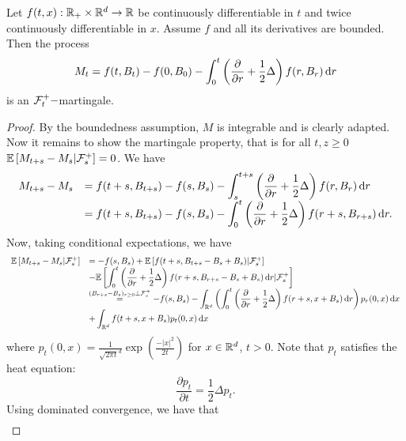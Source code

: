 \documentclass{article}
\begin{document}
\begin{theorem}\label{thm: bm ito formula}
Let $ f(t, x):\mathbb{R}_{+}\times \mathbb{R}^{d}\to \mathbb{R}$ be continuously differentiable in $ t$ and twice continuously differentiable in $ x$. Assume $ f$ and all its derivatives are bounded. Then the process 
\[
M_{t} = f(t, B_{t})-f(0, B_{0})- \displaystyle\int^{t}_{0} \left( \frac{\partial}{\partial r}+\frac{1}{2}\Delta \right) f(r, B_{r})\operatorname{d}\! r   
\]
is an $\mathcal{F}^{+}_{t}-$martingale. 
\end{theorem}

\begin{proof}
    By the boundedness assumption, $ M$ is integrable and is clearly adapted. Now it remains to show the martingale property, that is for all $ t, z\geq 0$ $ \mathbb{E}\left[ M_{t+s}-M_{s} |\mathcal{F}^{+}_{s}\right] = 0$. We have 
    \[
    \begin{array}{ll}
        M_{t+s}-M_{s} &= f(t+s, B_{t+s})-f(s, B_{s}) - \displaystyle\int^{t+s}_{s} \left( \frac{\partial}{\partial r}+\frac{1}{2}\Delta \right) f(r, B_{r})\operatorname{d}\! r    \\
         &= f(t+s, B_{t+s})-f(s, B_{s}) - \displaystyle\int^{t}_{0} \left( \frac{\partial}{\partial r}+\frac{1}{2}\Delta \right) f(r+s, B_{r+s})\operatorname{d}\! r.
    \end{array}
    \]
    Now, taking conditional expectations, we have 
    \[
    \begin{array}{ll}
        \mathbb{E}\left[ M_{t+s}-M_{s}  |\mathcal{F}^{+}_{s}\right] &= -f(s, B_{s}) + \mathbb{E}\left[ f(t+s, B_{t+s}-B_{s}+B_{s}) |\mathcal{F}^{+}_{s} \right] \\
         &- \mathbb{E}\left[ \displaystyle\int^{t}_{0} \left( \frac{\partial}{\partial r}+\frac{1}{2}\Delta \right) f(r+s, B_{r+s}-B_{s}+B_{s})\operatorname{d}\! r |\mathcal{F}^{+}_{s}\right]\\ 
	 &\stackrel{(B_{r+s}-B_{s})_{r\geq 0}\perp \mathcal{F}^{+}_{s}}{=} -f(s, B_{s}) - \displaystyle\int_{\mathbb{R}^{d}}\left( \displaystyle\int^{t}_{0} \left( \frac{\partial}{\partial r}+\frac{1}{2}\Delta \right) f(r+s, x+B_{s})\operatorname{d}\! r \right) p_{r}(0,x)\operatorname{d}\! x\\ 
	 &+ \displaystyle\int_{\mathbb{R}^{d}}f(t+s, x+B_{s}) p_{t}(0,x)\operatorname{d}\! x
    \end{array}
    \]
    where $ p_{t}(0,x) = \frac{1}{\sqrt{2\pi t}^{d}}\exp \left( \frac{-|x|^{2}}{2t} \right)$ for $ x\in \mathbb{R}^{d}$, $ t>0$. Note that $ p_{t}$ satisfies the heat equation:
    \[
    \frac{\partial p_{t}}{\partial{t}} = \frac{1}{2}\Delta p_{t}.
    \]
    Using dominated convergence, we have that 
    \[
    \begin{array}{ll}

\end{array}\]
\end{proof}
\end{document}
